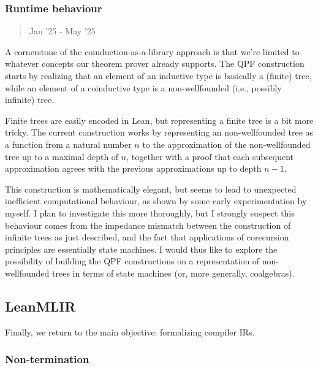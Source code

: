 \hypertarget{runtime-behaviour}{%
\subsubsection{Runtime behaviour}\label{runtime-behaviour}}

\begin{quote}
Jan '25 - May '25
\end{quote}

A cornerstone of the coinduction-as-a-library approach is that we're
limited to whatever concepts our theorem prover already supports. The
QPF construction starts by realizing that an element of an inductive
type is basically a (finite) tree, while an element of a coinductive
type is a non-wellfounded (i.e., possibly infinite) tree.

Finite trees are easily encoded in Lean, but representing a finite tree
is a bit more tricky. The current construction works by representing an
non-wellfounded tree as a function from a natural number \(n\) to the
approximation of the non-wellfounded tree up to a maximal depth of
\(n\), together with a proof that each subsequent approximation agrees
with the previous approximations up to depth \(n-1\).

This construction is mathematically elegant, but seems to lead to
unexpected inefficient computational behaviour, as shown by some early
experimentation by myself. I plan to investigate this more thoroughly,
but I strongly suspect this behaviour comes from the impedance mismatch
between the construction of infinite trees as just described, and the
fact that applications of corecursion principles are essentially state
machines. I would thus like to explore the possibility of building the
QPF constructions on a representation of non-wellfounded trees in terms
of state machines (or, more generally, coalgebras).

\hypertarget{leanmlir}{%
\subsection{LeanMLIR}\label{leanmlir}}

Finally, we return to the main objective: formalizing compiler IRs.

\hypertarget{non-termination}{%
\subsubsection{Non-termination}\label{non-termination}}

